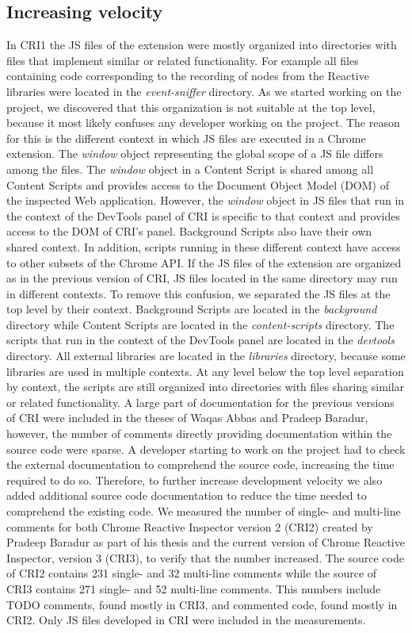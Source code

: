 \subsection{Increasing velocity}
In CRI1 the JS files of the extension were mostly organized into directories with files that implement similar or related functionality. For example all files containing code corresponding to the recording of nodes from the Reactive libraries were located in the \emph{event-sniffer} directory. As we started working on the project, we discovered that this organization is not suitable at the top level, because it most likely confuses any developer working on the project. The reason for this is the different context in which JS files are executed in a Chrome extension. The \emph{window} object representing the global scope of a JS file differs among the files. The \emph{window} object in a Content Script is shared among all Content Scripts and provides access to the Document Object Model (DOM) of the inspected Web application. However, the \emph{window} object in JS files that run in the context of the DevTools panel of CRI is specific to that context and provides access to the DOM of CRI's panel. Background Scripts also have their own shared context. In addition, scripts running in these different context have access to other subsets of the Chrome API. If the JS files of the extension are organized as in the previous version of CRI, JS files located in the same directory may run in different contexts. To remove this confusion, we separated the JS files at the top level by their context. Background Scripts are located in the \emph{background} directory while Content Scripts are located in the \emph{content-scripts} directory. The scripts that run in the context of the DevTools panel are located in the \emph{devtools} directory. All external libraries are located in the \emph{libraries} directory, because some libraries are used in multiple contexts. At any level below the top level separation by context, the scripts are still organized into directories with files sharing similar or related functionality.
A large part of documentation for the previous versions of CRI were included in the theses of Waqas Abbas and Pradeep Baradur, however, the number of comments directly providing documentation within the source code were sparse. A developer starting to work on the project had to check the external documentation to comprehend the source code, increasing the time required to do so. Therefore, to further increase development velocity we also added additional source code documentation to reduce the time needed to comprehend the existing code. We measured the number of single- and multi-line comments for both Chrome Reactive Inspector version 2 (CRI2) created by Pradeep Baradur as part of his thesis and the current version of Chrome Reactive Inspector, version 3 (CRI3), to verify that the number increased. The source code of CRI2 contains 231 single- and 32 multi-line comments while the source of CRI3 contains 271 single- and 52 multi-line comments. This numbers include TODO comments, found mostly in CRI3, and commented code, found mostly in CRI2. Only JS files developed in CRI were included in the measurements. 
